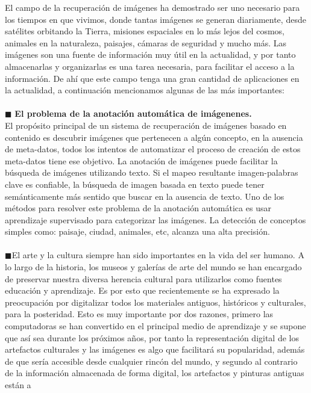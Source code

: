 \documentclass{llncs}
\begin{document}
El campo de la recuperación de imágenes ha demostrado ser uno necesario para los tiempos en que vivimos, donde tantas imágenes 
se generan diariamente, desde satélites orbitando la Tierra, misiones espaciales en lo más lejos del cosmos, 
animales en la naturaleza, paisajes, cámaras de seguridad y mucho más. Las imágenes son una fuente de información 
muy útil en la actualidad, y por tanto almacenarlas y organizarlas es una tarea necesaria, para facilitar 
el acceso a la información. De ahí que este campo tenga una gran cantidad de aplicaciones en la actualidad, 
a continuación mencionamos algunas de las más importantes:
\\\\
\noindent $\blacksquare$ \textbf{El problema de la anotación automática de imágenenes.}\\
El propósito principal de un sistema de recuperación de imágenes basado en contenido es descubrir imágenes que pertenecen a algún 
concepto, en la ausencia de meta-datos, todos los intentos de automatizar el proceso de creación de estos meta-datos tiene ese 
objetivo. La anotación de imágenes puede facilitar la búsqueda de imágenes utilizando texto. Si el mapeo resultante imagen-palabras 
clave es confiable, la búsqueda de imagen basada en texto puede tener semánticamente más sentido que buscar en la ausencia de texto. 
Uno de los métodos para resolver este problema de la anotación automática es usar aprendizaje supervisado para categorizar las 
imágenes. La detección de conceptos simples como: paisaje, ciudad, animales, etc, alcanza una alta precisión.
\\\\
\noindent $\blacksquare$El arte y la cultura siempre han sido importantes en la vida del ser humano. A lo largo de la historia, los museos y galerías 
de arte del mundo se han encargado de preservar nuestra diversa herencia cultural para utilizarlos como fuentes educación y 
aprendizaje. Es por esto que recientemente se ha expresado la preocupación por digitalizar todos los materiales antiguos, 
históricos y culturales, para la posteridad. Esto es muy importante por dos razones, primero las computadoras se han convertido 
en el principal medio de aprendizaje y se supone que así sea durante los próximos años, por tanto la representación digital de 
los artefactos culturales y las imágenes es algo que facilitará su popularidad, además de que sería accesible desde cualquier 
rincón del mundo, y segundo al contrario de la información almacenada de forma digital, los artefactos y pinturas antiguas están a 
\end{document}
